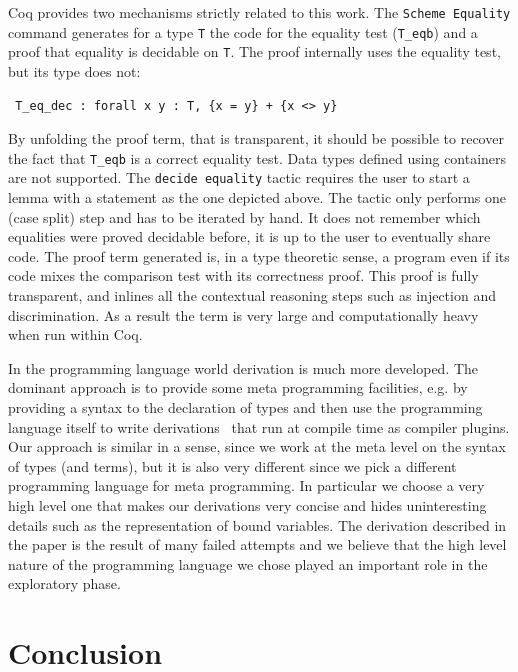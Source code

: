 \documentclass[a4paper,UKenglish,cleveref, autoref]{lipics-v2019}
\begin{document}
Coq provides two mechanisms strictly related to this work.
The \lstinline+Scheme Equality+ command generates for a type
\lstinline+T+ the code for the equality test (\lstinline+T_eqb+) 
and a proof that equality is decidable on \lstinline+T+. The proof
internally uses the equality test, but its type does not:

\begin{lstlisting}
 T_eq_dec : forall x y : T, {x = y} + {x <> y}
\end{lstlisting}

\noindent
By unfolding the proof term, that is transparent, it should be
possible to recover the fact that \lstinline+T_eqb+ is a correct
equality test. Data types defined using containers are not supported.
The \lstinline+decide equality+ tactic requires the user to start
a lemma with a statement as the one depicted above.
The tactic only performs one (case split) step and has to
be iterated by hand. It does not remember which equalities were
proved decidable before, it is up to the user to eventually share code.
The proof term generated is, in a type theoretic sense, a program
even if its code mixes the comparison test with its correctness proof.
This proof is fully transparent, and inlines all the contextual
reasoning steps such as injection and discrimination. As a result the
term is very large and computationally heavy when run within Coq.

In the programming language world derivation is much more developed.
The dominant approach is to provide some meta programming facilities,
e.g. by providing a syntax to the declaration of types and then use the
programming language itself to write 
derivations~\cite{Sheard:2002:TMH:636517.636528} that run at compile
time as compiler plugins. 
Our approach is similar in a sense, since we work at the meta level on
the syntax of types (and terms), but it is also very different since
we pick a different programming language for meta programming.  In
particular we choose a very high level one that makes our derivations
very concise and hides uninteresting details such as the
representation of bound variables.
The derivation described in the paper is the result of many failed
attempts and we believe that the high level nature of the programming
language we chose played an important role in the exploratory phase.

\section{Conclusion} %
\label{sec:conclusion}
\end{document}
